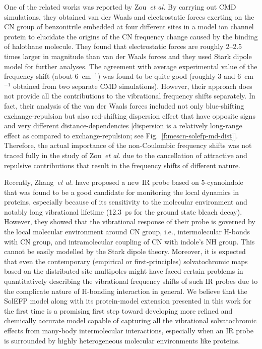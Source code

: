 \documentclass[a4paper,titlepage,twoside,fleqn,12pt]{book}
\begin{document}
\begin{refsection}
One of the related works was reported by Zou~\emph{et al.} By carrying
out CMD simulations, they obtained van der Waals and
electrostatic forces exerting on the CN group of benzonitrile
embedded at four different sites in a model ion channel
protein to elucidate the origins of the CN frequency change
caused by the binding of halothane molecule. \citep{Zou.Liu.Blasie.BiophysJ.2009} 
They found that
electrostatic forces are roughly 2--2.5 times larger in magnitude
than van der Waals forces and they used Stark dipole model
for further analyses. The agreement with average
experimental value of the frequency shift (about 6~cm$^{-1}$) was
found to be quite good (roughly 3 and 6~cm$^{-1}$ obtained from
two separate CMD simulations). However, their approach does
not provide all the contributions to the vibrational frequency
shifts separately. In fact, their analysis of the van der Waals
forces included not only blue\hyp{}shifting exchange\hyp{}repulsion but
also red\hyp{}shifting dispersion effect that have opposite signs and
very different distance\hyp{}dependencies [dispersion is a relatively
long\hyp{}range effect as compared to exchange\hyp{}repulsion; see
Fig.~\ref{f:mescn-solefp-md-dist}]. 
Therefore, the actual importance of the non\hyp{}Coulombic 
frequency shifts was not traced fully in the study of
Zou~\emph{et al.} \citep{Zou.Liu.Blasie.BiophysJ.2009}  
due to the cancellation of attractive and repulsive
contributions that result in the frequency shifts of different
nature.

Recently, Zhang~\emph{et al.} have proposed a new IR probe based on
5-cyanoindole that was found to be a good candidate for
monitoring the local dynamics in proteins, especially because
of its sensitivity to the molecular environment and notably
long vibrational lifetime (12.3~ps for the ground state bleach
decay). \citep{Zhang.Markiewicz.Doerksen.Smith.Gai.PCCP.2015} 
However, they showed that the vibrational response
of their probe is governed by the local molecular environment
around CN group, i.e., intermolecular H-bonds with CN group,
and intramolecular coupling of CN with indole's NH group. This
cannot be easily modelled by the Stark dipole theory.
Moreover, it is expected that even the contemporary
(empirical or first\hyp{}principles) solvatochromic maps based on
the distributed site multipoles \citep{Waegele.Gai.JCPL.2010,
Lee.Choi.Cho.JCP.2012,Blasiak.Lee.Cho.JCP.2013} might have faced certain
problems in quantitatively describing the vibrational frequency
shifts of such IR probes due to the complicate nature of H-bonding
interaction in general. We believe that the SolEFP
model along with its protein\hyp{}model extension presented in this
work for the first time is a promising first step toward
developing more refined and chemically accurate model
capable of capturing all the vibrational solvatochromic effects
from many\hyp{}body intermolecular interactions, especially when
an IR probe is surrounded by highly heterogeneous molecular
environments like proteins.



\end{refsection}
\end{document}

